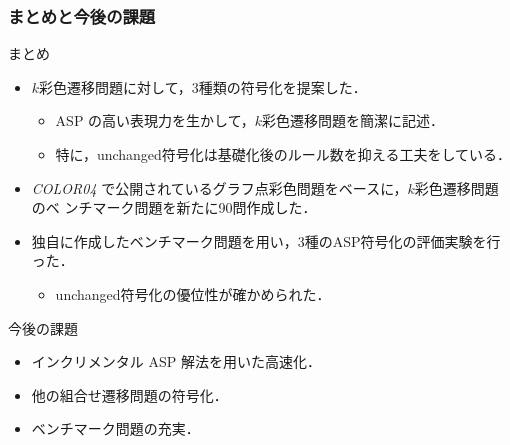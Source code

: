 \documentclass[dvipdfmx,11pt]{beamer}
\begin{document}
\begin{frame}\frametitle{まとめと今後の課題}

  \begin{block}{まとめ}
    \begin{itemize}
      \item $k$彩色遷移問題に対して，3種類の符号化を提案した．
      \begin{itemize}
      \item ASP の高い表現力を生かして，$k$彩色遷移問題を簡潔に記述．
      \item 特に，unchanged符号化は基礎化後のルール数を抑える工夫をしている．
      \end{itemize}
    \item \textit{COLOR04}
      で公開されているグラフ点彩色問題をベースに，$k$彩色遷移問題のベ
      ンチマーク問題を新たに90問作成した．
    \item 独自に作成したベンチマーク問題を用い，3種のASP符号化の評価実験を行った．
      \begin{itemize}
      \item unchanged符号化の優位性が確かめられた．
      \end{itemize}
    \end{itemize}
  \end{block}
  
  \begin{alertblock}{今後の課題}
    \begin{itemize}
      \item インクリメンタル ASP 解法を用いた高速化．
      \item 他の組合せ遷移問題の符号化．
      \item ベンチマーク問題の充実．
    \end{itemize}
  \end{alertblock}

\end{frame}



\end{document}
